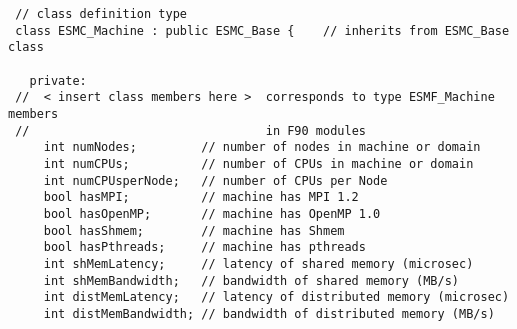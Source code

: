 
\begin{verbatim}
 // class definition type
 class ESMC_Machine : public ESMC_Base {    // inherits from ESMC_Base class

   private:
 //  < insert class members here >  corresponds to type ESMF_Machine members
 //                                 in F90 modules
     int numNodes;         // number of nodes in machine or domain
     int numCPUs;          // number of CPUs in machine or domain
     int numCPUsperNode;   // number of CPUs per Node
     bool hasMPI;          // machine has MPI 1.2
     bool hasOpenMP;       // machine has OpenMP 1.0
     bool hasShmem;        // machine has Shmem
     bool hasPthreads;     // machine has pthreads
     int shMemLatency;     // latency of shared memory (microsec)
     int shMemBandwidth;   // bandwidth of shared memory (MB/s)
     int distMemLatency;   // latency of distributed memory (microsec)
     int distMemBandwidth; // bandwidth of distributed memory (MB/s)
\end{verbatim}
